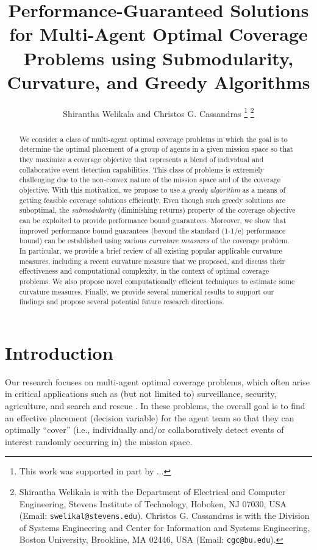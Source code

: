 \documentclass[letterpaper, 10 pt, conference]{ieeeconf}
\title{\LARGE \bf
Performance-Guaranteed Solutions for Multi-Agent Optimal Coverage Problems using Submodularity, Curvature, and Greedy Algorithms 
}
\author{Shirantha Welikala and Christos G. Cassandras %
\thanks{This work was supported in part by ... }
\thanks{Shirantha Welikala is with the Department of Electrical and Computer Engineering, Stevens Institute of Technology, Hoboken, NJ 07030, USA (Email: \texttt{{\small swelikal@stevens.edu}}). Christos G. Cassandras is with the Division of Systems Engineering and Center for Information and Systems Engineering, Boston University, Brookline, MA 02446, USA (Email: \texttt{{\small cgc@bu.edu}}).}}
\begin{document}
\maketitle

\thispagestyle{plain}
\pagestyle{plain}



\begin{abstract}
We consider a class of multi-agent optimal coverage problems in which the goal is to determine the optimal placement of a group of agents in a given mission space so that they maximize a coverage objective that represents a blend of individual and collaborative event detection capabilities. This class of problems is extremely challenging due to the non-convex nature of the mission space and of the coverage objective. With this motivation, we propose to use a \emph{greedy algorithm} as a means of getting feasible coverage solutions efficiently. Even though such greedy solutions are suboptimal, the \emph{submodularity} (diminishing returns) property of the coverage objective can be exploited to provide performance bound guarantees. Moreover, we show that improved performance bound guarantees (beyond the standard (1-1/e) performance bound) can be established using various \emph{curvature measures} of the coverage problem. In particular, we provide a brief review of all existing popular applicable curvature measures, including a recent curvature measure that we proposed, and discuss their effectiveness and computational complexity, in the context of optimal coverage problems. We also propose novel computationally efficient techniques to estimate some curvature measures. Finally, we provide several numerical results to support our findings and propose several potential future research directions. 
\end{abstract}




\section{Introduction}



Our research focuses on multi-agent optimal coverage problems, which often arise in critical applications such as (but not limited to) surveillance, security, agriculture, and search and rescue \cite{Rezazadeh2019,Cohen2008}. In these problems, the overall goal is to find an effective placement (decision variable) for the agent team so that they can optimally ``cover'' (i.e., individually and/or collaboratively detect events of interest randomly occurring in) the mission space. 
\end{document}
